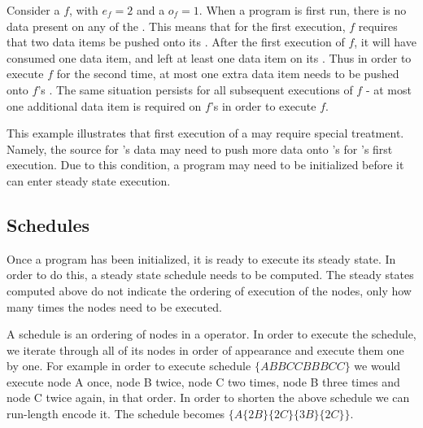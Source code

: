 Consider a {\filter} $f$, with $e_f = 2$ and a $o_f = 1$. When a
{\StreamIt} program is first run, there is no data present on any
of the {\Channels}.  This means that for the first execution,
{\filter} $f$ requires that two data items be pushed onto its
{\Input} {\Channel}.  After the first execution of $f$, it will
have consumed one data item, and left at least one data item on
its {\Input} {\Channel}.  Thus in order to execute $f$ for the
second time, at most one extra data item needs to be pushed onto
$f$'s {\Input} {\Channel}.  The same situation persists for all
subsequent executions of $f$ - at most one additional data item is
required on $f$'s {\Input} {\Channel} in order to execute $f$.

This example illustrates that first execution of a {\filter} may
require special treatment.  Namely, the source for {\filter}'s data
may need to push more data onto {\filter}'s {\Input} {\Channel} for
{\filter}'s first execution.  Due to this condition, a {\StreamIt}
program may need to be initialized before it can enter steady
state execution.

\begin{comment}
There are other constraints (latency constraints) which may
require more complex initialization.  These will be discussed in
Chapter \ref{chpt:constrained}.

After an execution, a {\filter} $f$ must leave at least $e_f - o_f$
data on its {\Input} {\Channel}.  Thus, if the only constraints on
initialization are peek-related, it is a sufficient condition for
entering steady state schedule that $\forall f \in {\filters}, in_f
\ge e_f - o_f$.

Specific strategies for generating initialization schedules for
peeking will be presented in Chapter \ref{chpt:hierarchical} and
Chapter \ref{chpt:phased}.
\end{comment}

\subsection{Schedules}
\label{sec:general:schedules}

Once a program has been initialized, it is ready to execute its
steady state. In order to do this, a steady state schedule needs
to be computed. The steady states computed above do not indicate
the ordering of execution of the nodes, only how many times the
nodes need to be executed.

A schedule is an ordering of nodes in a {\StreamIt} operator. In
order to execute the schedule, we iterate through all of its nodes
in order of appearance and execute them one by one.  For example
in order to execute schedule $\{ABBCCBBBCC\}$ we would execute
node A once, node B twice, node C two times, node B three times
and node C twice again, in that order. In order to shorten the
above schedule we can run-length encode it.  The schedule becomes
$\{A \{2B\}\{2C\}\{3B\}\{2C\}\}$.

